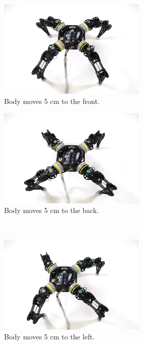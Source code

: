 \begin{figure}[ht]
    \centering
    \begin{subfigure}[b]{0.45\textwidth}
        \centering
        \includegraphics[width=70mm]{./fig/chap4/body_movement/front05cmslant.JPG}
        \caption{Body moves 5 cm to the front.}
        \label{slantfront}
    \end{subfigure}
    \begin{subfigure}[b]{0.45\textwidth}
        \centering
        \includegraphics[width=70mm]{./fig/chap4/body_movement/back05cmslant.JPG}
        \caption{Body moves 5 cm to the back.}
        \label{slantback}
    \end{subfigure}
    \\
    \begin{subfigure}[b]{0.45\textwidth}
        \centering
        \includegraphics[width=70mm]{./fig/chap4/body_movement/left05cmslant.JPG}
        \caption{Body moves 5 cm to the left.}
        \label{slantleft}
    \end{subfigure}
    \begin{subfigure}[b]{0.45\textwidth}
        \centering

\end{subfigure}
\end{figure}
